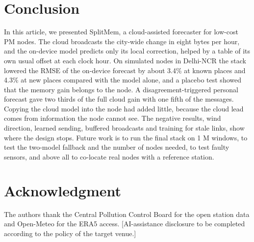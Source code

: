 \documentclass[journal]{IEEEtran}
\begin{document}
\section{Conclusion}
\label{sec:conclusion}
In this article, we presented SplitMem, a cloud-assisted forecaster for low-cost PM nodes. The cloud broadcasts the city-wide change in eight bytes per hour, and the on-device model predicts only its local correction, helped by a table of its own usual offset at each clock hour. On simulated nodes in Delhi-NCR the stack lowered the RMSE of the on-device forecast by about 3.4\% at known places and 4.3\% at new places compared with the model alone, and a placebo test showed that the memory gain belongs to the node. A disagreement-triggered personal forecast gave two thirds of the full cloud gain with one fifth of the messages. Copying the cloud model into the node had added little, because the cloud lead comes from information the node cannot see. The negative results, wind direction, learned sending, buffered broadcasts and training for stale links, show where the design stops. Future work is to run the final stack on 1 M windows, to test the two-model fallback and the number of nodes needed, to test faulty sensors, and above all to co-locate real nodes with a reference station.

\section*{Acknowledgment}
The authors thank the Central Pollution Control Board for the open station data and Open-Meteo for the ERA5 access. [AI-assistance disclosure to be completed according to the policy of the target venue.]

\FloatBarrier


\end{document}
